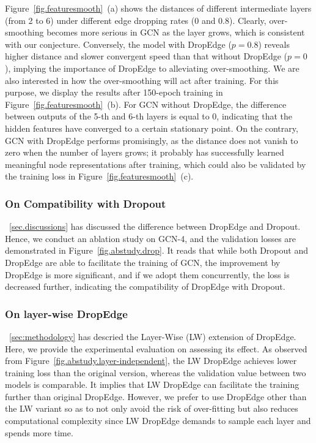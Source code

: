 \documentclass{article}
\begin{document}
Figure~\ref{fig.featuresmooth}~(a) shows the distances of different intermediate layers (from 2 to 6) under different edge dropping rates (0 and 0.8). Clearly, over-smoothing becomes more serious in GCN as the layer grows, which is consistent with our conjecture. Conversely, the model with DropEdge ($p=0.8$) reveals higher distance and slower convergent speed than that without DropEdge ($p=0$), implying the importance of DropEdge to alleviating over-smoothing.
We are also interested in how the over-smoothing will act after training. For this purpose, we display the results after 150-epoch training in Figure~\ref{fig.featuresmooth}~(b). For GCN without DropEdge, the difference between outputs of the 5-th and 6-th layers is equal to 0, indicating that the hidden features have converged to a certain stationary point. On the contrary, GCN with DropEdge performs promisingly, as the distance does not vanish to zero when the number of layers grows; it probably has successfully learned meaningful node representations after training, which could also be validated by the training loss in Figure~\ref{fig.featuresmooth}~(c).

\subsubsection{On Compatibility with Dropout}
\textsection~\ref{sec.discussions} has discussed the difference between DropEdge and Dropout. Hence, we conduct an ablation study on GCN-4, and the validation losses are demonstrated in Figure~\ref{fig.abstudy.drop}. It reads that while both Dropout and DropEdge are able to facilitate the training of GCN, the improvement by DropEdge is more significant, and if we adopt them concurrently, the loss is decreased further, indicating the compatibility of DropEdge with Dropout.


\subsubsection{On layer-wise DropEdge}
\textsection~\ref{sec:methodology} has descried the Layer-Wise (LW) extension of DropEdge. Here, we provide the experimental evaluation on assessing its effect. As observed from Figure~\ref{fig.abstudy.layer-independent}, the LW DropEdge achieves lower training loss than the original version, whereas the validation value between two models is comparable. It implies that LW DropEdge can facilitate the training further than original DropEdge. However, we prefer to use DropEdge other than the LW variant so as to not only avoid the risk of over-fitting but also reduces computational complexity since LW DropEdge demands to sample each layer and spends more time.
\end{document}
